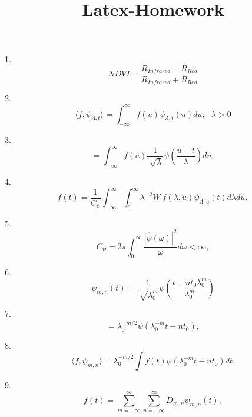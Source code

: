 \documentclass{article}
\begin{document}
\title{Latex-Homework}
1. $$NDVI=\frac{R_{Infrared}-R_{Red}}{R_{Infrared}+R_{Red}}$$

2. $$\langle{f},\psi_{\Lambda,t}\rangle=\int_{-\infty}^{\infty} f(u)\psi_{\Lambda,t}(u)du,\	\ \ \lambda>0$$

3. $$=\int_{-\infty}^{\infty}f(u)\frac{1}{\sqrt[]{\lambda}}\psi\left(\frac{u-t}{\lambda}\right)du, $$

4. $$f(t)=\frac{1}{C_\psi}\int_{-\infty}^{\infty}\int_{0}^{\infty}\lambda^{-2} W \ f(\lambda,u)\psi_{\Lambda,u}(t)d\lambda du,$$

5. $$C_\psi = 2\pi \int_{0}^{\infty} \frac{|\hat{\psi}(\omega)|^2}{\omega} d\omega<\infty,$$

6. $$\psi_{m,n}(t)=\frac{1}{\sqrt[]{\lambda_{0}^m}}\psi \left(\frac{t-nt_{0}\lambda_{0}^m}{\lambda_{0}^m}\right)$$

7. $$=\lambda_{0}^{-m/2} \psi \left(\lambda_{0}^{-m} t - nt_{0} \right),$$

8. $$\langle{f,\psi_{m,n}}\rangle =\lambda_{0}^{-m/2} \int f(t)\psi \left(\lambda_{0}^{-m}t - nt_{0} \right) dt.$$

9. $$f(t)=\sum_{m=-\infty}^{\infty} \sum_{n=-\infty}^{\infty} D_{m,n} \psi_{m,n}(t),$$
\end{document}
